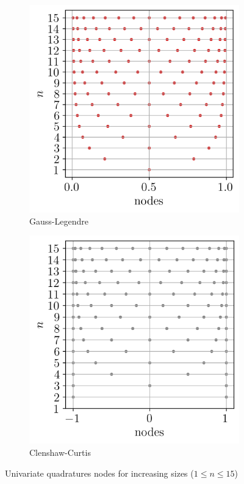 \begin{figure}[ht]
    \centering
    \begin{subfigure}[b]{0.32\textwidth}
        \centering
        \includegraphics[width=\textwidth]{../numerical_experiments/chapter1/figures/univariate_gauss_legendre.png}
        \caption{Gauss-Legendre}
    \end{subfigure}
    \quad
    \begin{subfigure}[b]{0.32\textwidth}
        \centering
        \includegraphics[width=\textwidth]{../numerical_experiments/chapter1/figures/univariate_clenshaw_curtis.png}
        \caption{Clenshaw-Curtis}
    \end{subfigure}
    \caption{Univariate quadratures nodes for increasing sizes ($1 \leq n \leq 15$)}
    \label{fig:univariate_quads}
\end{figure}


